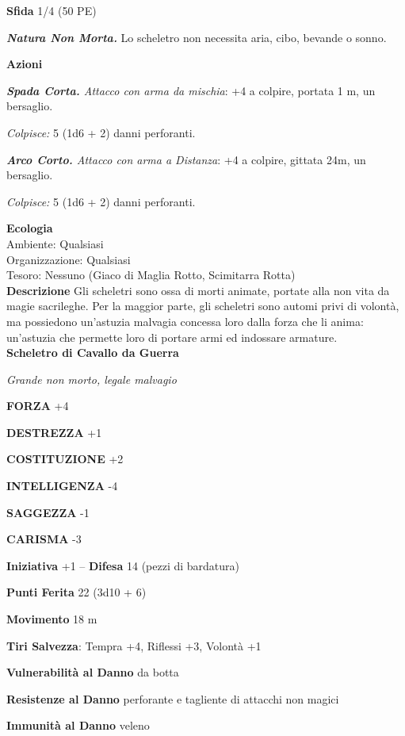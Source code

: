 \begin{multicols}{2}
\textbf{Sfida} 1/4 (50 PE)

\emph{\textbf{Natura Non Morta.}} Lo scheletro non necessita aria, cibo, bevande o sonno.

\textbf{Azioni}

\emph{\textbf{Spada Corta.} Attacco con arma da mischia}: +4 a colpire, portata 1 m, un bersaglio.

\emph{Colpisce:} 5 (1d6 + 2) danni perforanti.

\emph{\textbf{Arco Corto.} Attacco con arma a Distanza}: +4 a colpire, gittata 24m, un bersaglio.

\emph{Colpisce:} 5 (1d6 + 2) danni perforanti.

\textbf{Ecologia}\\
Ambiente: Qualsiasi\\
Organizzazione: Qualsiasi\\
Tesoro: Nessuno (Giaco di Maglia Rotto, Scimitarra Rotta)\\
\textbf{Descrizione}
Gli scheletri sono ossa di morti animate, portate alla non vita da magie sacrileghe. Per la maggior parte, gli scheletri sono automi privi di volontà, ma possiedono un'astuzia malvagia concessa loro dalla forza che li anima: un'astuzia che permette loro di portare armi ed indossare armature.\\


\medskip{}\textbf{Scheletro di Cavallo da Guerra}

\emph{Grande non morto, legale malvagio}

\textbf{FORZA} +4

\textbf{DESTREZZA} +1

\textbf{COSTITUZIONE} +2

\textbf{INTELLIGENZA} -4

\textbf{SAGGEZZA} -1

\textbf{CARISMA} -3

\textbf{Iniziativa} +1 -- \textbf{Difesa} 14 (pezzi di bardatura)

\textbf{Punti Ferita} 22 (3d10 + 6)

\textbf{Movimento} 18 m

\textbf{Tiri Salvezza}: Tempra +4, Riflessi +3, Volontà +1

\textbf{Vulnerabilità al Danno} da botta

\textbf{Resistenze al Danno} perforante e tagliente di attacchi non magici

\textbf{Immunità al Danno} veleno


\end{multicols}
